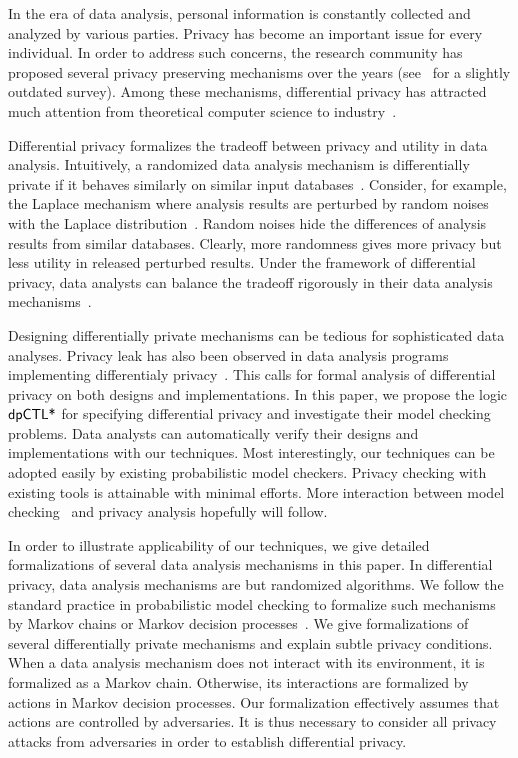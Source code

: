 

In the era of data analysis, personal information is constantly
collected and analyzed by various parties. Privacy has become an
important issue for every individual. In order to address such
concerns, the research community has proposed several privacy
preserving mechanisms over the years (see~\cite{FWC:10:PPDP} for a
slightly outdated survey). Among these mechanisms, differential
privacy has attracted much attention from theoretical computer science
to industry~\cite{DR:14:AFDP,JLE:14:DPML,A:16:EPYU}.

Differential privacy formalizes the tradeoff between privacy and
utility in data analysis. Intuitively, a randomized data analysis
mechanism is differentially private if it behaves similarly on similar
input databases~\cite{DMNS:06:CNSPD,D:06:DP}. Consider, for example,
the Laplace mechanism where analysis results are perturbed by random
noises with the Laplace distribution~\cite{DR:14:AFDP}. Random noises
hide the differences of analysis results from similar databases.
Clearly, more
randomness gives more privacy but less utility in released perturbed
results. Under the framework of differential privacy, data analysts
can balance the tradeoff rigorously in their data analysis
mechanisms~\cite{DR:14:AFDP,JLE:14:DPML}.


Designing differentially private mechanisms can be tedious for
sophisticated data analyses. Privacy leak has also been observed in
data analysis programs implementing differentialy
privacy~\cite{M:12:SLSBDP,TKBW:17:PLAI}. This calls for formal 
analysis of differential privacy on both designs and implementations.
In this paper, we propose the logic $\textsf{dpCTL*}$ for specifying
differential privacy and investigate their model checking
problems. Data analysts can automatically verify their designs and
implementations with our techniques. Most interestingly, our
techniques can be adopted easily by existing probabilistic
model checkers. Privacy checking with existing tools is attainable
with minimal efforts. More interaction
between model checking~\cite{ManneP92,BK:08:PMC} and privacy analysis hopefully will follow.


In order to illustrate applicability of our techniques, we give
detailed formalizations of several data analysis mechanisms in this
paper.
In differential privacy, data analysis mechanisms are
but randomized algorithms. We follow the standard practice in
probabilistic model checking to formalize such mechanisms
by Markov chains or Markov decision processes~\cite{Put05}. We give
formalizations of several differentially private mechanisms and
explain subtle privacy conditions.
When a data analysis mechanism does not
interact with its environment, it is formalized as a Markov
chain. Otherwise, its interactions are formalized by actions in
Markov decision processes. Our formalization effectively assumes that
actions are controlled by adversaries. It is thus necessary to
consider all privacy attacks from adversaries in order to establish
differential privacy.

